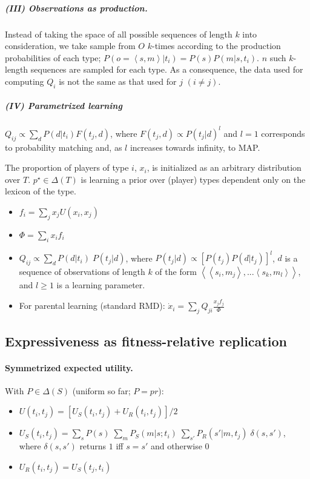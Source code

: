 \documentclass[a4paper]{article}
\newcommand{\tuple}[1]{\ensuremath{\left\langle #1 \right\rangle}}
\begin{document}
\subparagraph{(III) Observations as production.} Instead of taking the space of all possible sequences of length $k$ into consideration, we take sample from $O$ $k$-times according to the production probabilities of each type; $P(o = \tuple{s,m} | t_i) = P(s) P(m|s,t_i)$. $n$ such $k$-length sequences are sampled for each type. As a consequence, the data used for computing $Q_i$ is not the same as that used for $j$ $(i \neq j)$.

\subparagraph{(IV) Parametrized learning} $Q_{ij} \propto \sum_d P(d|t_i) F(t_j,d)$, where $F(t_j,d) \propto P(t_j|d)^l$ and $l =1$ corresponds to probability matching and, as $l$ increases towards infinity, to MAP.  	      

The proportion of players of type $i$, $x_i$, is initialized as an arbitrary distribution over $T$. $p^\star \in \Delta(T)$ is learning a prior over (player) types dependent only on the lexicon of the type. 
\begin{itemize}
    \item $f_i = \sum_j x_j U(x_i,x_j)$
    \item $\Phi = \sum_i x_i f_i$
    \item $Q_{ij} \propto \sum_d P(d|t_i) \; P(t_j|d)$, where $P(t_j|d) \propto [P(t_j) P(d|t_j)]^l$, $d$ is a sequence of observations of length $k$ of the form \tuple{\tuple{s_i,m_j}, ... \tuple{s_k, m_l}}, and $l \geq 1$ is a learning parameter.
	\item For parental learning (standard RMD): $\dot x_i = \sum_j Q_{ji} \frac{x_j f_j}{\Phi}$
\end{itemize}


\subsection{Expressiveness as fitness-relative replication}

\paragraph{Symmetrized expected utility.} With $P \in \Delta(S)$ (uniform so far; $P = pr$):
\begin{itemize}

  \item $U(t_i,t_j) = [U_S(t_i,t_j) + U_R(t_i,t_j)] / 2$
  \item $U_S(t_i,t_j) = \sum_s P(s) \; \sum_m P_S(m|s;t_i) \; \sum_{s'} P_R(s'|m,t_j) \; \delta(s,s')$, where $\delta(s,s')$ returns $1$ iff $s = s'$ and otherwise $0$
  \item $U_R(t_i,t_j) = U_S(t_j,t_i)$
\end{itemize}
\end{document}
